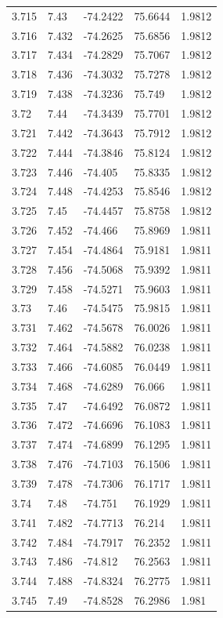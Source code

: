 \begin{tabular}{lllll}
3.715 & 7.43 & -74.2422 & 75.6644 & 1.9812 \\
3.716 & 7.432 & -74.2625 & 75.6856 & 1.9812 \\
3.717 & 7.434 & -74.2829 & 75.7067 & 1.9812 \\
3.718 & 7.436 & -74.3032 & 75.7278 & 1.9812 \\
3.719 & 7.438 & -74.3236 & 75.749 & 1.9812 \\
3.72 & 7.44 & -74.3439 & 75.7701 & 1.9812 \\
3.721 & 7.442 & -74.3643 & 75.7912 & 1.9812 \\
3.722 & 7.444 & -74.3846 & 75.8124 & 1.9812 \\
3.723 & 7.446 & -74.405 & 75.8335 & 1.9812 \\
3.724 & 7.448 & -74.4253 & 75.8546 & 1.9812 \\
3.725 & 7.45 & -74.4457 & 75.8758 & 1.9812 \\
3.726 & 7.452 & -74.466 & 75.8969 & 1.9811 \\
3.727 & 7.454 & -74.4864 & 75.9181 & 1.9811 \\
3.728 & 7.456 & -74.5068 & 75.9392 & 1.9811 \\
3.729 & 7.458 & -74.5271 & 75.9603 & 1.9811 \\
3.73 & 7.46 & -74.5475 & 75.9815 & 1.9811 \\
3.731 & 7.462 & -74.5678 & 76.0026 & 1.9811 \\
3.732 & 7.464 & -74.5882 & 76.0238 & 1.9811 \\
3.733 & 7.466 & -74.6085 & 76.0449 & 1.9811 \\
3.734 & 7.468 & -74.6289 & 76.066 & 1.9811 \\
3.735 & 7.47 & -74.6492 & 76.0872 & 1.9811 \\
3.736 & 7.472 & -74.6696 & 76.1083 & 1.9811 \\
3.737 & 7.474 & -74.6899 & 76.1295 & 1.9811 \\
3.738 & 7.476 & -74.7103 & 76.1506 & 1.9811 \\
3.739 & 7.478 & -74.7306 & 76.1717 & 1.9811 \\
3.74 & 7.48 & -74.751 & 76.1929 & 1.9811 \\
3.741 & 7.482 & -74.7713 & 76.214 & 1.9811 \\
3.742 & 7.484 & -74.7917 & 76.2352 & 1.9811 \\
3.743 & 7.486 & -74.812 & 76.2563 & 1.9811 \\
3.744 & 7.488 & -74.8324 & 76.2775 & 1.9811 \\
3.745 & 7.49 & -74.8528 & 76.2986 & 1.981 \\

\end{tabular}
